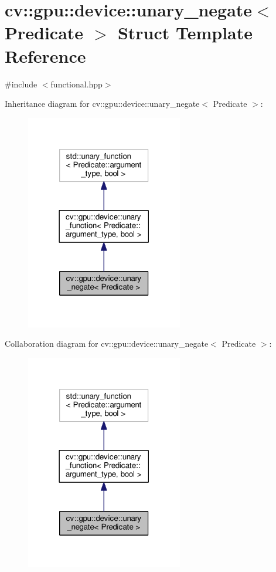 \hypertarget{structcv_1_1gpu_1_1device_1_1unary__negate}{\section{cv\-:\-:gpu\-:\-:device\-:\-:unary\-\_\-negate$<$ Predicate $>$ Struct Template Reference}
\label{structcv_1_1gpu_1_1device_1_1unary__negate}
}


{\ttfamily \#include $<$functional.\-hpp$>$}



Inheritance diagram for cv\-:\-:gpu\-:\-:device\-:\-:unary\-\_\-negate$<$ Predicate $>$\-:\nopagebreak
\begin{figure}[H]
\begin{center}
\leavevmode
\includegraphics[width=194pt]{structcv_1_1gpu_1_1device_1_1unary__negate__inherit__graph}
\end{center}
\end{figure}


Collaboration diagram for cv\-:\-:gpu\-:\-:device\-:\-:unary\-\_\-negate$<$ Predicate $>$\-:\nopagebreak
\begin{figure}[H]
\begin{center}
\leavevmode
\includegraphics[width=194pt]{structcv_1_1gpu_1_1device_1_1unary__negate__coll__graph}
\end{center}
\end{figure}
